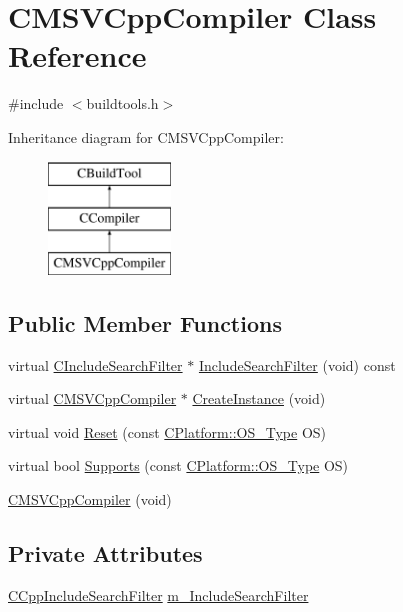 \hypertarget{classCMSVCppCompiler}{\section{C\-M\-S\-V\-Cpp\-Compiler Class Reference}
\label{classCMSVCppCompiler}
}


{\ttfamily \#include $<$buildtools.\-h$>$}

Inheritance diagram for C\-M\-S\-V\-Cpp\-Compiler\-:\begin{figure}[H]
\begin{center}
\leavevmode
\includegraphics[height=3.000000cm]{d8/dcd/classCMSVCppCompiler}
\end{center}
\end{figure}
\subsection*{Public Member Functions}
\begin{DoxyCompactItemize}
\item 
virtual \hyperlink{classCIncludeSearchFilter}{C\-Include\-Search\-Filter} $\ast$ \hyperlink{classCMSVCppCompiler_a67117b6e7c193f8d7357f32b868252cd}{Include\-Search\-Filter} (void) const 
\item 
virtual \hyperlink{classCMSVCppCompiler}{C\-M\-S\-V\-Cpp\-Compiler} $\ast$ \hyperlink{classCMSVCppCompiler_ace8c0f315b83286474cdf8c8b41db75a}{Create\-Instance} (void)
\item 
virtual void \hyperlink{classCMSVCppCompiler_ac159b7332272495733a159641a1e6274}{Reset} (const \hyperlink{classCPlatform_a2fb735c63c53052f79629e338bb0f535}{C\-Platform\-::\-O\-S\-\_\-\-Type} O\-S)
\item 
virtual bool \hyperlink{classCMSVCppCompiler_a468de125fdf0a36980a537c67b0cf23a}{Supports} (const \hyperlink{classCPlatform_a2fb735c63c53052f79629e338bb0f535}{C\-Platform\-::\-O\-S\-\_\-\-Type} O\-S)
\item 
\hyperlink{classCMSVCppCompiler_aa75f38a3c9f37c65b51efdadd27da9eb}{C\-M\-S\-V\-Cpp\-Compiler} (void)
\end{DoxyCompactItemize}
\subsection*{Private Attributes}
\begin{DoxyCompactItemize}
\item 
\hyperlink{classCCppIncludeSearchFilter}{C\-Cpp\-Include\-Search\-Filter} \hyperlink{classCMSVCppCompiler_ac559c23d7be2807dd5a2a531455eab71}{m\-\_\-\-Include\-Search\-Filter}
\end{DoxyCompactItemize}
